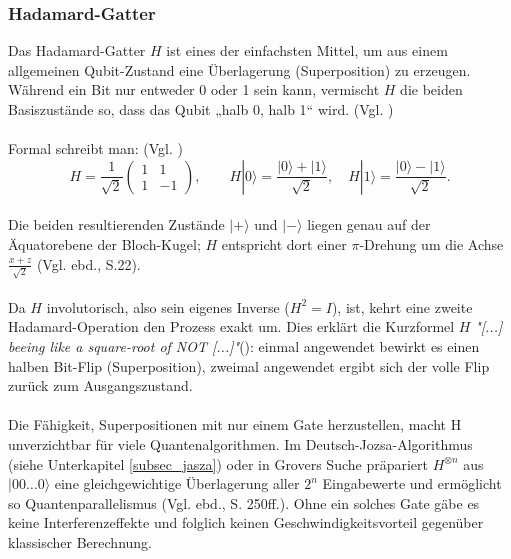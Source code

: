 \subsubsection{Hadamard-Gatter}\label{subsubsec:hadamard_gatter}
Das Hadamard-Gatter $H$ ist eines der einfachsten Mittel, um aus einem allgemeinen Qubit-Zustand eine Überlagerung (Superposition) zu erzeugen.  Während ein Bit nur entweder 0 oder 1 sein kann, vermischt $H$ die beiden Basiszustände so, dass das Qubit  „halb 0, halb 1“ wird. (Vgl. \cite[S.19f.]{nielsen_quantum_2010})\\
\\
Formal schreibt man: (Vgl. \cite[S.76]{rieffel_quantum_2011})
\\
\begin{equation}
  H = \frac1{\sqrt2}\!
  \begin{pmatrix} 1 & 1 \\ 1 & -1 \end{pmatrix},
  \qquad
  H|0\rangle=\frac{|0\rangle+|1\rangle}{\sqrt2},
  \quad
  H|1\rangle=\frac{|0\rangle-|1\rangle}{\sqrt2}.
\end{equation}
\\
Die beiden resultierenden Zustände $|+\rangle$ und $|-\rangle$ liegen genau auf der Äquatorebene der Bloch-Kugel; $H$ entspricht dort einer $\pi$-Drehung um die Achse $\tfrac{x+z}{\sqrt2}$ (Vgl. ebd., S.22).\\
\\
Da $H$ involutorisch, also sein eigenes Inverse ($H^2=I$), ist, kehrt eine zweite Hadamard-Operation den Prozess exakt um.  Dies erklärt die Kurzformel $H$ \emph{"[...] beeing like a square-root of NOT [...]"}(\cite[S.19]{nielsen_quantum_2010}): einmal angewendet bewirkt es einen halben Bit-Flip (Superposition), zweimal angewendet ergibt sich der volle Flip zurück zum Ausgangszustand.\\
\\
Die Fähigkeit, Superpositionen mit nur einem Gate herzustellen, macht H unverzichtbar für viele Quantenalgorithmen.  Im Deutsch-Jozsa-Algorithmus (siehe Unterkapitel \ref{subsec_jasza}) oder in Grovers Suche präpariert $H^{\otimes n}$ aus $|00\ldots0\rangle$ eine gleichgewichtige Überlagerung aller $2^{n}$ Eingabewerte und ermöglicht so Quantenparallelismus (Vgl. ebd., S. 250ff.).  Ohne ein solches Gate gäbe es keine Interferenzeffekte und folglich keinen Geschwindigkeitsvorteil gegenüber klassischer Berechnung.



